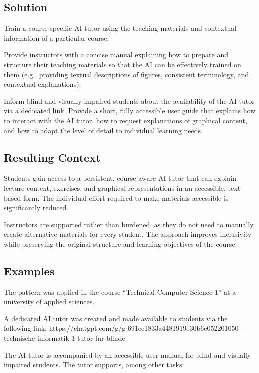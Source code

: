 \subsection*{Solution}


\begin{sol}
Train a course-specific AI tutor using the teaching materials and contextual information of a particular course.
\end{sol}



Provide instructors with a concise manual explaining how to prepare and structure their teaching materials so that the AI can be effectively trained on them (e.g., providing textual descriptions of figures, consistent terminology, and contextual explanations).

Inform blind and visually impaired students about the availability of the AI tutor via a dedicated link. Provide a short, fully accessible user guide that explains how to interact with the AI tutor, how to request explanations of graphical content, and how to adapt the level of detail to individual learning needs.

\subsection*{Resulting Context}

Students gain access to a persistent, course-aware AI tutor that can explain lecture content, exercises, and graphical representations in an accessible, text-based form. The individual effort required to make materials accessible is significantly reduced.

Instructors are supported rather than burdened, as they do not need to manually create alternative materials for every student. The approach improves inclusivity while preserving the original structure and learning objectives of the course.

\subsection*{Examples}
The pattern was applied in the course “Technical Computer Science 1” at a university of applied sciences.

A dedicated AI tutor was created and made available to students via the following link:
https://chatgpt.com/g/g-691ee1833a4481919e30b6c052201050-technische-informatik-1-tutor-fur-blinde

The AI tutor is accompanied by an accessible user manual for blind and visually impaired students. The tutor supports, among other tasks:

